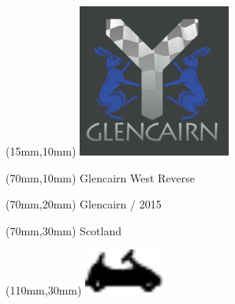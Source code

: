 \null\newpage
\begin{textblock*}{50mm}(15mm,10mm)%
\includegraphics[width=50mm]{LG/GLCN.png}
\end{textblock*}
\begin{textblock*}{130mm}(70mm,10mm)%
{\fontsize{20}{20}\selectfont Glencairn West Reverse}\\
\end{textblock*}
\begin{textblock*}{120mm}(70mm,20mm)%
{\fontsize{16}{16}\selectfont Glencairn / 2015}\\
\end{textblock*}
\begin{textblock*}{120mm}(70mm,30mm)%
{\fontsize{12}{12}\selectfont Scotland}
\end{textblock*}
\begin{textblock*}{30mm}(110mm,30mm)%
\centering
\includegraphics[height=15mm]{icons/kart.pdf}
\end{textblock*}
